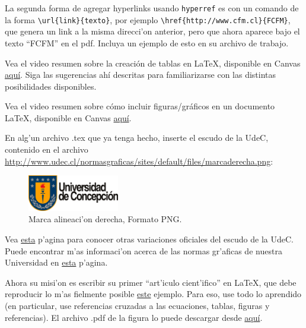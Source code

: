 \documentclass[11pt]{exam}
\begin{document}
\begin{questions}
\item La segunda forma de agregar hyperlinks usando \texttt{hyperref} es con un comando de la forma \verb|\url{link}{texto}|, por ejemplo \verb|\href{http://www.cfm.cl}{FCFM}|, que genera un link a la misma direcci'on anterior, pero que ahora aparece bajo el texto ``FCFM'' en el pdf. Incluya un ejemplo de esto en su archivo de trabajo.

\item Vea el video resumen sobre la creación de tablas en \LaTeX, disponible en Canvas \href{https://udec.instructure.com/courses/40179/pages/tablas?module_item_id=1465510}{aquí}. Siga las sugerencias ahí descritas para familiarizarse con las distintas posibilidades disponibles.

\item Vea el video resumen sobre cómo incluir figuras/gráficos en un documento \LaTeX, disponible en Canvas \href{https://udec.instructure.com/courses/40179/pages/figuras?module_item_id=1465511}{aquí}.
\item En alg'un archivo .tex que ya tenga hecho, inserte el escudo de la UdeC, contenido en el archivo \url{http://www.udec.cl/normasgraficas/sites/default/files/marcaderecha.png}:
\begin{figure}[h!]
\begin{center}
\includegraphics[width=4cm]{marcaderecha.png}
\end{center}
\caption{Marca alineaci'on derecha, Formato PNG.}
\label{fig:escudo}
\end{figure}

Vea \href{http://www.udec.cl/normasgraficas/node/7}{esta} p'agina para conocer otras variaciones oficiales del escudo de la UdeC. 
Puede encontrar m'as informaci'on acerca de las normas gr'aficas de nuestra Universidad en \href{http://www.udec.cl/normasgraficas}{esta} p'agina.

\item Ahora su misi'on es escribir su primer ``art'iculo cient'ifico'' en \LaTeX, que debe reproducir lo m'as fielmente posible \href{https://github.com/gfrubi/CC/blob/master/guias/06/ejemplo-articulo.pdf}{este} ejemplo. Para eso, use todo lo aprendido (en particular, use referencias cruzadas a las ecuaciones, tablas, figuras y referencias). El archivo .pdf de la figura lo puede descargar desde \href{https://github.com/gfrubi/CC/blob/master/guias/06/fig-ajuste-lineal.pdf}{aqu\'i}.


\end{questions}
\end{document}
